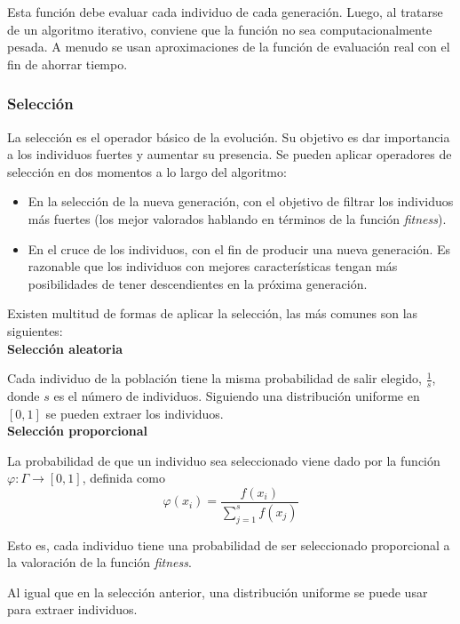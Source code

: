 			Esta funci\'on debe evaluar cada individuo de cada generaci\'on. Luego, al tratarse de un algoritmo iterativo, conviene que la funci\'on no sea computacionalmente pesada. A menudo se usan aproximaciones de la funci\'on de evaluaci\'on real con el fin de ahorrar tiempo.
		
			\subsubsection{Selecci\'on}
			La selecci\'on es el operador b\'asico de la evoluci\'on. Su objetivo es dar importancia a los individuos fuertes y aumentar su presencia. Se pueden aplicar operadores de selecci\'on en dos momentos a lo largo del algoritmo:
			\begin{itemize}
				\item En la selecci\'on de la nueva generaci\'on, con el objetivo de filtrar los individuos m\'as fuertes (los mejor valorados hablando en t\'erminos de la funci\'on \textit{fitness}).
				\item En el cruce de los individuos, con el fin de producir una nueva generaci\'on. Es razonable que los individuos con mejores caracter\'isticas tengan m\'as posibilidades de tener descendientes en la pr\'oxima generaci\'on.
			\end{itemize}
			
			\hspace{0.25cm}Existen multitud de formas de aplicar la selecci\'on, las m\'as comunes son las siguientes:\\
			
			\textbf{Selecci\'on aleatoria}
			
			Cada individuo de la poblaci\'on tiene la misma probabilidad de salir elegido, $\frac{1}{s}$, donde $s$ es el n\'umero de individuos. Siguiendo una distribuci\'on uniforme en $[0,1]$ se pueden extraer los individuos.\\
			
			\textbf{Selecci\'on proporcional}
			
			La probabilidad de que un individuo sea seleccionado viene dado por la funci\'on $\varphi:\Gamma\rightarrow [0,1]$, definida como
			\[\varphi(x_i)=\frac{f(x_i)}{\sum\limits_{j=1}^{s}f(x_j)}\]
			
			Esto es, cada individuo tiene una probabilidad de ser seleccionado proporcional a la valoraci\'on de la funci\'on \textit{fitness}.
			
			Al igual que en la selecci\'on anterior, una distribuci\'on uniforme se puede usar para extraer individuos.
			
